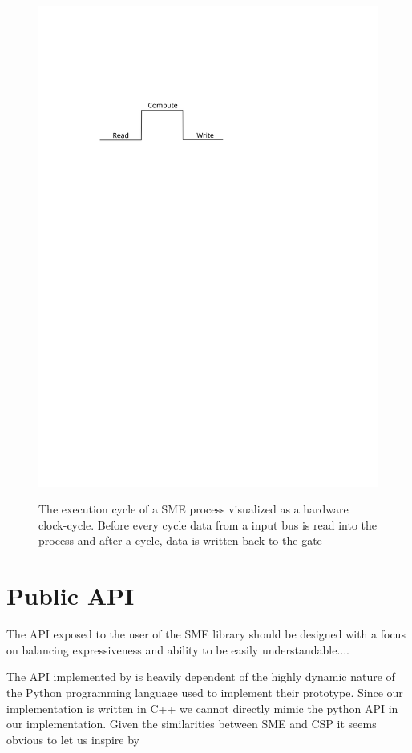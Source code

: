 \begin{figure}
\centering
\includegraphics{figures/execution-cycle}
\label{fig:cycle}
\caption[Execution flow of a SME-process]{The execution cycle of a
  SME process visualized as a hardware clock-cycle. Before every cycle
  data from a input bus is read into the process and after a cycle,
  data is written back to the gate}
\end{figure}

\section{Public API}
The API exposed to the user of the SME library should be designed with
a focus on balancing expressiveness and ability to be easily
understandable....

The API implemented by \cite{vinter2014synchronous} is heavily
dependent of the highly dynamic nature of the Python programming
language used to implement their prototype. Since our implementation
is written in C++ we cannot directly mimic the python API in our
implementation. Given the similarities between SME and CSP it seems
obvious to let us inspire by

